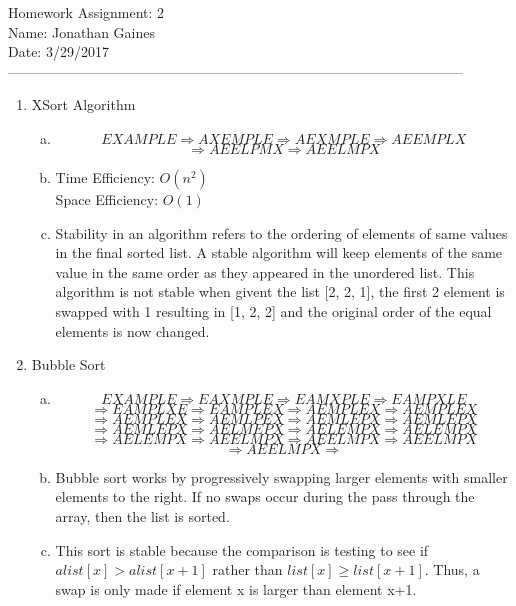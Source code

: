 \documentclass[12pt]{article}
\begin{document}
Homework Assignment: 2\\ 
Name: Jonathan Gaines\\ 
Date: 3/29/2017\\ --------------------------------------------------------------------------------------------------
\begin {enumerate}
\item XSort Algorithm
	\begin {enumerate}[(a)]
		\item
		$$EXAMPLE\Rightarrow 
			AXEMPLE\Rightarrow	
			AEXMPLE\Rightarrow
			AEEMPLX$$ $$\Rightarrow 
		  AEELPMX\Rightarrow
			AEELMPX $$		
		\item
			Time Efficiency: $O(n^{2})$ \\
			Space Efficiency: $O(1)$ 
		\item 
						Stability in an algorithm refers to the ordering of elements of same values in the final sorted list. A stable algorithm will keep elements of the same value in the same order as they appeared in the unordered list. This algorithm is not stable when givent the list [2, 2, 1], the first 2 element is swapped with 1 resulting in [1, 2, 2] and the original order of the equal elements is now changed. \par
	\end {enumerate}
\item Bubble Sort
	\begin {enumerate}[(a)]
		\item
		$$EXAMPLE\Rightarrow
			EAXMPLE\Rightarrow
			EAMXPLE\Rightarrow
			EAMPXLE$$ $$\Rightarrow
			EAMPLXE\Rightarrow
			EAMPLEX\Rightarrow
			AEMPLEX\Rightarrow
			AEMPLEX$$ $$\Rightarrow
			AEMPLEX\Rightarrow
			AEMLPEX\Rightarrow
			AEMLEPX\Rightarrow
			AEMLEPX$$ $$\Rightarrow
			AEMLEPX\Rightarrow
			AELMEPX\Rightarrow
			AELEMPX\Rightarrow
			AELEMPX$$ $$\Rightarrow
			AELEMPX\Rightarrow
			AEELMPX\Rightarrow
			AEELMPX\Rightarrow
			AEELMPX$$ $$\Rightarrow
			AEELMPX\Rightarrow
		$$
		\item
			Bubble sort works by progressively swapping larger elements with smaller elements to the right. If no swaps occur during the pass through the array, then the list is sorted. \par
		\item
			This sort is stable because the comparison is testing to see if $alist[x] > alist[x+1]$ rather than $list[x] \geq list[x+1]$. Thus, a swap is only made if element x is larger than element x+1. \par 
	\end {enumerate}

\end{enumerate}
\end{document}
